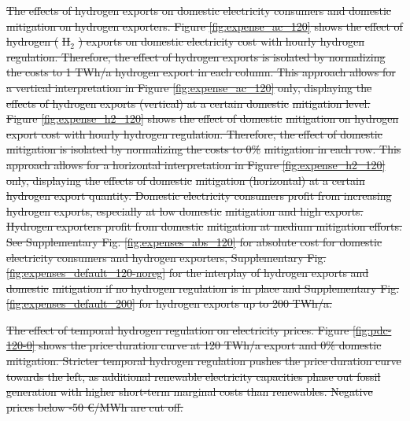 \documentclass[5p,numafflabel]{elsarticle}
\newcommand{\co}{\ce{CO2}~}
\def\co{CO${}_2${\:}}
\providecommand{\DIFdeltex}[1]{{\protect\color{red}\sout{#1}}}                      %
\providecommand{\DIFdelFL}[1]{\DIFdel{#1}} %
\providecommand{\DIFdel}[1]{\texorpdfstring{\DIFdeltex{#1}}{}} %
\begin{document}
{%
\DIFdelFL{The effects of hydrogen exports on domestic electricity consumers and domestic }%
\DIFdelFL{mitigation on hydrogen exporters.
    Figure \ref{fig:expense_ac_120} shows the effect of hydrogen (}%
\DIFdelFL{H${}_2$}%
\DIFdelFL{) exports on domestic electricity cost with hourly hydrogen regulation. Therefore, the effect of hydrogen exports is isolated by normalizing the costs to 1 TWh/a hydrogen export in each column. This approach allows for a vertical interpretation in Figure \ref{fig:expense_ac_120} only, displaying the effects of hydrogen exports (vertical) at a certain domestic }%
\DIFdelFL{mitigation level.
    Figure \ref{fig:expense_h2_120} shows the effect of domestic }%
\DIFdelFL{mitigation on hydrogen export cost with hourly hydrogen regulation. Therefore, the effect of domestic }%
\DIFdelFL{mitigation is isolated by normalizing the costs to 0\% }%
\DIFdelFL{mitigation in each row. This approach allows for a horizontal interpretation in Figure \ref{fig:expense_h2_120} only, displaying the effects of domestic }%
\DIFdelFL{mitigation (horizontal) at a certain hydrogen export quantity.
    Domestic electricity consumers profit from increasing hydrogen exports, especially at low domestic }%
\DIFdelFL{mitigation and high exports. Hydrogen exporters profit from domestic }%
\DIFdelFL{mitigation at medium mitigation efforts.
    See Supplementary Fig. \ref{fig:expenses_abs_120} for absolute cost for domestic electricity consumers and hydrogen exporters, Supplementary Fig. \ref{fig:expenses_default_120-noreg} for the interplay of hydrogen exports and domestic }%
\DIFdelFL{mitigation if no hydrogen regulation is in place and Supplementary Fig. \ref{fig:expenses_default_200} for hydrogen exports up to 200 TWh/a.
    }}

{%
\DIFdelFL{The effect of temporal hydrogen regulation on electricity prices.
    Figure \ref{fig:pdc-120-0} shows the price duration curve at 120 TWh/a export and 0\% domestic }%
\DIFdelFL{mitigation. Stricter temporal hydrogen regulation pushes the price duration curve towards the left, as additional renewable electricity capacities phase out fossil generation with higher short-term marginal costs than renewables. Negative prices below -50 €/MWh are cut off.}}
\end{document}

